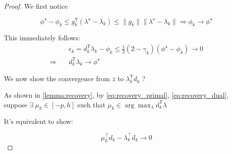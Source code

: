 \documentclass[../main]{subfiles}
\begin{document}
\begin{proof}
  We first notice

  \[
    \phi^\star - \phi_k \le g_k^\mathsf{T} (\lambda^\star - \lambda_k)\le \|g_k\|\|\lambda^\star - \lambda_k\| \Rightarrow \phi_k \to \phi^\star
  \]

  This immediately follows:
  \begin{subequations}
    \begin{align}\label{eq:eps_subgrad_to_subgrad}
                        & \epsilon_k = d_k^\mathsf{T} \lambda_k - \phi_k\le \frac{1}{2}(2 - \gamma_k) ( \phi^\star - \phi_k) \to 0 \\
      \Rightarrow \quad & d_k^\mathsf{T} \lambda_k \to \phi^\star
    \end{align}
  \end{subequations}

  We now show the convergence from \(\bar z\) to \(\lambda_k ^ \mathsf{T} d_k\) ?

  As shown in \ref{lemma:recovery}, by \eqref{eq:recovery_primal}, \eqref{eq:recovery_dual},
  suppose \(\exists\; \mu_k \in [-p, h]\) such that \(\mu_k \in \arg\max_{\lambda} d_k^\mathsf{T} \lambda \)

  It's equivalent to show:

  \begin{equation}\label{eq:mu_d_to_lambda_d}
    \mu_k^\top d_k - \lambda_k^\top d_k \to 0
  \end{equation}



\end{proof}
\end{document}
